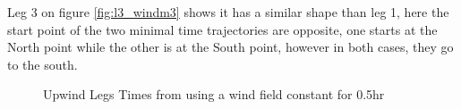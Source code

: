 Leg 3 on figure \ref{fig:l3_windm3} shows it has a similar shape than leg 1, here the start point of the two minimal time trajectories are opposite, one starts at the North point while the other is at the South point, however in both cases, they go to the south. \par 


\begin{figure} [hbt!]
  \centering
  \hfill
  \caption{Upwind Legs Times from using a wind field constant for 0.5hr} %
\label{fig:Windm3_upwind}
\end{figure}

